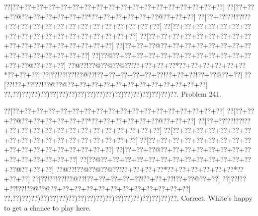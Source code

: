 \documentclass[a5paper]{article}
\begin{document}
\begin{center}
{\goo
\0??[\0??+\0??+\0??+\0??+\0??+\0??+\0??+\0??+\0??+\0??+\0??+\0??+\0??+\0??+\0??+\0??+\0??+\0??]
\0??[\0??+\0??+\0??@\0??+\0??+\0??+\0??+\0??+\0??*\0??+\0??+\0??+\0??+\0??+\0??@\0??+\0??+\0??]
\0??[\0??+\0??!\0??!\0??!\0??+\0??+\0??+\0??+\0??+\0??+\0??+\0??+\0??+\0??+\0??+\0??+\0??+\0??]
\0??[\0??+\0??+\0??+\0??+\0??+\0??+\0??+\0??+\0??+\0??+\0??+\0??+\0??+\0??+\0??+\0??+\0??+\0??]
\0??[\0??+\0??+\0??+\0??+\0??+\0??+\0??+\0??+\0??+\0??+\0??+\0??+\0??+\0??+\0??+\0??+\0??+\0??]
\0??[\0??+\0??+\0??@\0??+\0??+\0??+\0??+\0??+\0??+\0??+\0??+\0??+\0??+\0??+\0??+\0??+\0??+\0??]
\0??[\0??@\0??+\0??+\0??+\0??+\0??+\0??+\0??+\0??+\0??+\0??+\0??+\0??+\0??+\0??@\0??+\0??+\0??]
\0??@\0??!\0??@\0??@\0??@\0??!\0??+\0??+\0??+\0??*\0??+\0??+\0??+\0??+\0??+\0??*\0??+\0??+\0??]
\0??[\0??!\0??!\0??!\0??@\0??!\0??+\0??+\0??+\0??+\0??+\0??!\0??+\0??+\0??!\0??+\0??@\0??+\0??]
\0??[\0??!\0??+\0??!\0??!\0??@\0??@\0??+\0??+\0??+\0??+\0??+\0??+\0??+\0??+\0??+\0??+\0??+\0??]
\0??,\0??)\0??)\0??)\0??)\0??)\0??)\0??)\0??)\0??)\0??)\0??)\0??)\0??)\0??)\0??)\0??)\0??)\0??.
}
Problem 241.

\end{center}
\begin{center}
{\goo
\0??[\0??+\0??+\0??+\0??+\0??+\0??+\0??+\0??+\0??+\0??+\0??+\0??+\0??+\0??+\0??+\0??+\0??+\0??]
\0??[\0??+\0??+\0??@\0??+\0??+\0??+\0??+\0??+\0??*\0??+\0??+\0??+\0??+\0??+\0??@\0??+\0??+\0??]
\0??[\0??+\0??!\0??!\0??!\0??+\0??+\0??+\0??+\0??+\0??+\0??+\0??+\0??+\0??+\0??+\0??+\0??+\0??]
\0??[\0??+\0??+\0??+\0??+\0??+\0??+\0??+\0??+\0??+\0??+\0??+\0??+\0??+\0??+\0??+\0??+\0??+\0??]
\0??[\0??+\0??+\0??+\0??+\0??+\0??+\0??+\0??+\0??+\0??+\0??+\0??+\0??+\0??+\0??+\0??+\0??+\0??]
\0??[\0??+\0??+\0??@\0??+\0??+\0??+\0??+\0??+\0??+\0??+\0??+\0??+\0??+\0??+\0??+\0??+\0??]
\0??[\0??@\0??+\0??+\0??+\0??+\0??+\0??+\0??+\0??+\0??+\0??+\0??+\0??+\0??+\0??@\0??+\0??+\0??]
\0??@\0??!\0??@\0??@\0??@\0??!\0??+\0??+\0??+\0??*\0??+\0??+\0??+\0??+\0??+\0??*\0??+\0??+\0??]
\0??[\0??!\0??!\0??!\0??@\0??!\0??+\0??+\0??+\0??+\0??!\0??+\0??+\0??!\0??+\0??@\0??+\0??]
\0??[\0??!\0??+\0??!\0??!\0??@\0??@\0??+\0??+\0??+\0??+\0??+\0??+\0??+\0??+\0??+\0??+\0??+\0??]
\0??,\0??)\0??)\0??)\0??)\0??)\0??)\0??)\0??)\0??)\0??)\0??)\0??)\0??)\0??)\0??)\0??)\0??)\0??.
}
Correct. White's happy to get a chance to play here.

\end{center}
\end{document}
